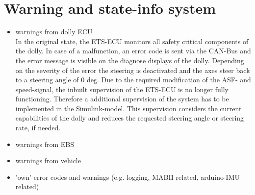 \documentclass[ExampleMasters.tex]{subfiles}
\begin{document}
\section{Warning and state-info system}
\label{sec:warning_system}
\begin{itemize}
	\item warnings from dolly ECU \\
	In the original state, the ETS-ECU monitors all safety critical components of the dolly. In case of a malfunction, an error code is sent via the CAN-Bus and the error message is visible on the diagnose displays of the dolly. Depending on the severity of the error the steering is deactivated and the axes steer back to a steering angle of 0 deg.
	Due to the required modification of the ASF- and speed-signal, the inbuilt supervision of the ETS-ECU is no longer fully functioning. Therefore a additional supervision of the system has to be implemented in the Simulink-model. This supervision considers the current capabilities of the dolly and reduces the requested steering angle or steering rate, if needed.    
	\item warnings from EBS
	\item warnings from vehicle
	\item 'own' error codes and warnings (e.g. logging, MABII related, arduino-IMU related)
\end{itemize}
\end{document}
